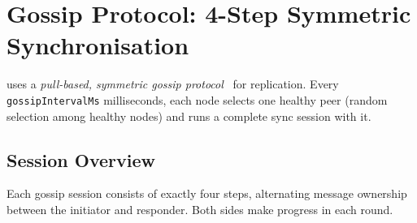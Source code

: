\section{Gossip Protocol: 4-Step Symmetric Synchronisation}
\label{sec:gossip}

\pebble{} uses a \emph{pull-based, symmetric gossip protocol}~\cite{demers1987epidemic,
kermarrec2007gossip} for replication. Every \texttt{gossipIntervalMs} milliseconds,
each node selects one healthy peer (random selection among healthy nodes) and
runs a complete sync session with it.

\subsection{Session Overview}

Each gossip session consists of exactly four steps, alternating message ownership
between the initiator and responder. Both sides make progress in each round.

